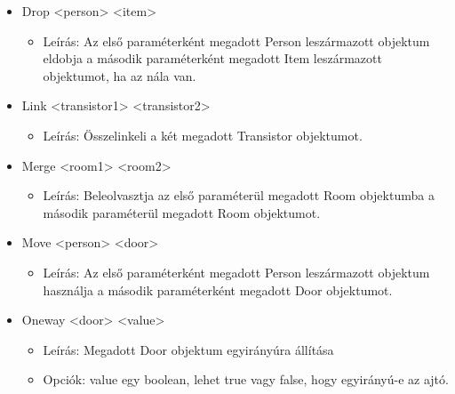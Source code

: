 \begin{itemize}
    \item Drop <person> <item>
    \begin{itemize}
        \item Leírás: Az első paraméterként megadott Person leszármazott objektum eldobja a második paraméterként megadott Item leszármazott objektumot, ha az nála van.
    \end{itemize}

    \item Link <transistor1> <transistor2>
    \begin{itemize}
        \item Leírás: Összelinkeli a két megadott Transistor objektumot.
    \end{itemize}

    \item Merge <room1> <room2>
    \begin{itemize}
        \item Leírás: Beleolvasztja az első paraméterül megadott Room objektumba a második paraméterül megadott Room objektumot.
    \end{itemize}
    
    \item Move <person> <door>
    \begin{itemize}
        \item Leírás: Az első paraméterként megadott Person leszármazott objektum használja a második paraméterként megadott Door objektumot.
    \end{itemize}
    
    \item Oneway <door> <value>
    \begin{itemize}
        \item Leírás: Megadott Door objektum egyirányúra állítása
        \item Opciók: value egy boolean, lehet true vagy false, hogy egyirányú-e az ajtó.
    \end{itemize}
    

\end{itemize}
